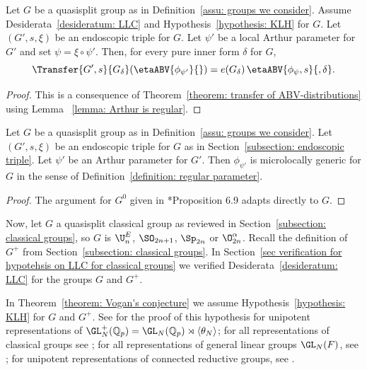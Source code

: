 \documentclass[11pt,letterpaper]{amsart}
\numberwithin{equation}{section}
\begin{document}
\begin{corollary}\label{corollary: transfer in Arthur type}
Let $G$ be a quasisplit group as in Definition~\ref{assu: groups we consider}. 
Assume Desiderata~\ref{desideratum: LLC} and Hypothesis~\ref{hypothesis: KLH} for $G$.
Let $(G',s,\xi)$ be an endoscopic triple for $G$.
Let $\psi'$ be a local Arthur parameter for $G'$ and set $\psi = \xi\circ\psi'$. 
Then, for every pure inner form $\delta$ for $G$,
    \[
    \Transfer{G',s}{G_\delta}( \etaABV{\phi_{\psi'}}{})
    =
    e(G_\delta)\,
    \etaABV{\phi_{\psi},s}{,\delta}.   
    \]
\end{corollary}

\begin{proof}
    This is a consequence of Theorem~\ref{theorem: transfer of ABV-distributions} using Lemma~
    \ref{lemma: Arthur is regular}.
\end{proof}


\begin{lemma}\label{lemma: Arthur is regular}
    Let $G$ be a quasisplit group as in Definition~\ref{assu: groups we consider}.
    Let $(G',s,\xi)$ be an endoscopic triple for $G$ as in Section~\ref{subsection: endoscopic triple}.
    Let $\psi'$ be an Arthur parameter for $G'$.
    Then $\phi_{\psi'}$ is microlocally generic for $G$ in the sense of Definition~\ref{definition: regular parameter}. 
\end{lemma}

\begin{proof}
The argument for $G^0$ given in \cite{CFMMX22}*{Proposition 6.9} adapts directly to $G$.
\end{proof}

Now, let $G$ a quasisplit classical group as reviewed in Section~\ref{subsection: classical groups}, so $G$ is $\U^E_{n}$, $\SO_{2n+1}$, $\Sp_{2n}$ or $\O^{\alpha}_{2n}$.
Recall the definition of $G^+$ from Section~\ref{subsection: classical groups}.
In Section~\ref{sec verification for hypotehsis on LLC for classical groups} we verified Desiderata~\ref{desideratum: LLC} for the groups $G$ and $G^+$. 


\begin{remark}
In Theorem~\ref{theorem: Vogan's conjecture} we assume Hypothesis~\ref{hypothesis: KLH} for $G$ and $G^+$. 
See \cite{CHAI} for the proof of this hypothesis for unipotent representations of $\GL_N^+(\mathbb{Q}_p) = \GL_N(\mathbb{Q}_p)\rtimes\langle\theta_N\rangle$;
for all representations of classical groups see \cite{Sol25};
for all representations of general linear groups $\GL_N(F)$, see \cite{bal25};
for unipotent representations of connected reductive groups, see \cites{Lus02, CG10, Sol25}.
\end{remark}
\end{document}
